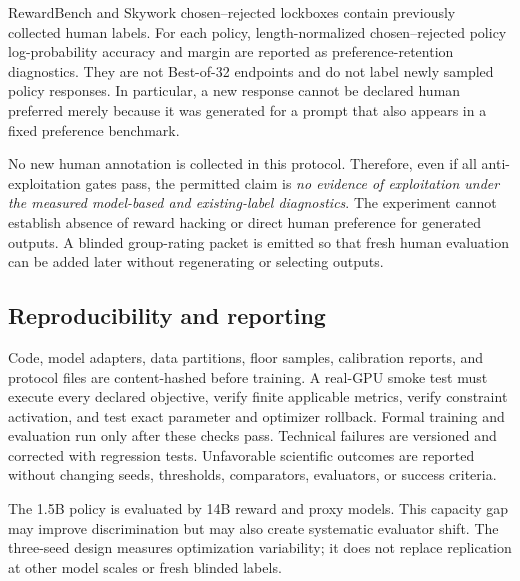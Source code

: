 RewardBench and Skywork chosen--rejected lockboxes contain previously collected
human labels.  For each policy, length-normalized chosen--rejected policy
log-probability accuracy and margin are reported as preference-retention
diagnostics.  They are not Best-of-32 endpoints and do not label newly sampled
policy responses.  In particular, a new response cannot be declared human
preferred merely because it was generated for a prompt that also appears in a
fixed preference benchmark.

No new human annotation is collected in this protocol.  Therefore, even if
all anti-exploitation gates pass, the permitted claim is
\emph{no evidence of exploitation under the measured model-based and
existing-label diagnostics}.  The experiment cannot establish absence of
reward hacking or direct human preference for generated outputs.  A blinded
group-rating packet is emitted so that fresh human evaluation can be added
later without regenerating or selecting outputs.

\subsection{Reproducibility and reporting}
\label{subsec:reproducibility}

Code, model adapters, data partitions, floor samples, calibration reports, and
protocol files are content-hashed before training.  A real-GPU smoke test must
execute every declared objective, verify finite applicable metrics, verify
constraint activation, and test exact parameter and optimizer rollback.
Formal training and evaluation run only after these checks pass.  Technical
failures are versioned and corrected with regression tests.  Unfavorable
scientific outcomes are reported without changing seeds, thresholds,
comparators, evaluators, or success criteria.

The 1.5B policy is evaluated by 14B reward and proxy models.  This capacity
gap may improve discrimination but may also create systematic evaluator shift.
The three-seed design measures optimization variability; it does not replace
replication at other model scales or fresh blinded labels.
